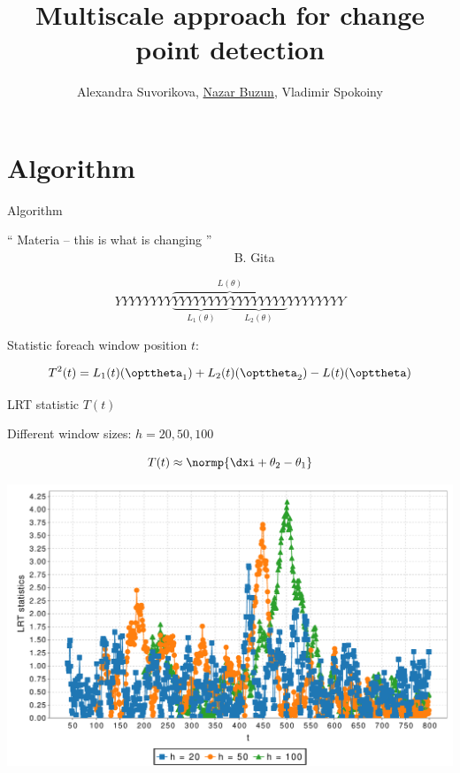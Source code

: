 \documentclass[9pt,english]{beamer}   %
\begin{document}
\title{Multiscale approach for change point detection}
\author{Alexandra Suvorikova, \underline{Nazar Buzun}, Vladimir Spokoiny}
\date{}

\titlepage     %

\section[Algorithm]{Algorithm}

\begin{frame}{Algorithm}

\begin{center}
`` Materia -- this is what is changing ''  \\
$\quad\quad\quad\quad\quad\quad\quad\quad\quad\quad\quad\quad\quad\quad\quad\quad\quad\quad$ 
B. Gita
\end{center}

\[
YYYYYYYY
\overbrace{
\underbrace{YYYYYYYY}_{L_1(\theta)}\underbrace{YYYYYYYY}_{L_2(\theta)}
}^{L(\theta)}
YYYYYYYY
\]

Statistic foreach window position $t$:

\[
T^2(t) =  L_1(t)(\opttheta_1) + L_2(t)(\opttheta_2) - L(t)(\opttheta)
\]

\end{frame}

\begin{frame}{LRT statistic $T(t)$}

Different window sizes: $h = {20, 50, 100}$

\[
T(t) \approx \normp{\dxi + \theta_2 - \theta_1}
\]

\begin{center}
\includegraphics[scale=0.4]{../../img/mlscale_lrt.pdf}
\end{center}

\end{frame}
\end{document}
